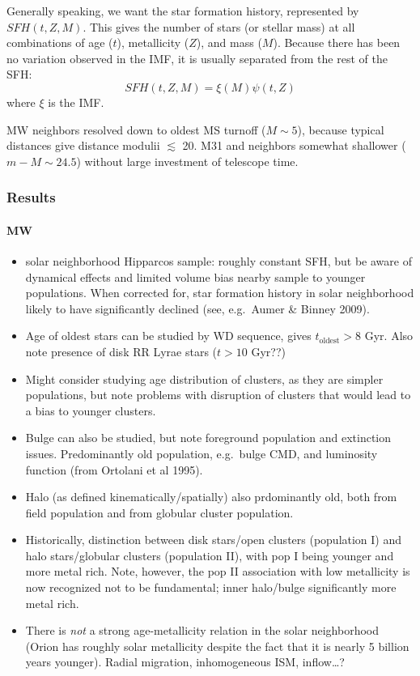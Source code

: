 \documentclass{article}
\begin{document}
Generally speaking, we want the star formation history, represented by
$SFH(t,Z,M)$. This gives the number of stars (or stellar mass)
at all combinations of age ($t$), metallicity ($Z$), and mass ($M$).
Because there has been no variation observed in the IMF, it is usually
separated from the rest of the SFH:
\[
    SFH(t,Z,M) = \xi(M)\psi(t,Z)
    \]
where $\xi$ is the IMF.

MW neighbors resolved down to oldest MS turnoff ($M \sim 5$),
because typical distances give distance modulii $\lesssim$ 20.
M31 and neighbors somewhat shallower ($m-M \sim 24.5$)
without large investment of telescope time.

\subsubsection{Results}
\paragraph{MW}
\begin{itemize}
    \item {solar neighborhood Hipparcos sample}: roughly constant {SFH}, but be
        aware of dynamical effects and limited volume bias nearby sample to
        younger populations. When corrected for, star formation history in
        solar neighborhood likely to have significantly declined (see, e.g.\
        {Aumer \& Binney 2009}).
    \item Age of oldest stars can be studied by WD sequence, gives
        $t_{\textrm{oldest}} > 8$ Gyr. Also note presence of disk RR Lyrae
        stars ($t > 10$ Gyr??)
    \item Might consider studying age distribution of clusters, as they are
        simpler populations, but note problems with disruption of clusters that
        would lead to a bias to younger clusters.
    \item Bulge can also be studied, but note foreground population and
        extinction issues. Predominantly old population, e.g.\ {bulge CMD}, and
        {luminosity function} (from {Ortolani et al 1995}).
    \item Halo (as defined kinematically/spatially) also prdominantly old, both
        from field population and from globular cluster population.
    \item Historically, distinction between disk stars/open clusters
        (population I) and halo stars/globular clusters (population II), with
        pop I being younger and more metal rich. Note, however, the pop II
        association with low metallicity is now recognized not to be
        fundamental; inner halo/bulge significantly more metal rich.
    \item There is \emph{not} a strong age-metallicity relation in the solar
        neighborhood (Orion has roughly solar metallicity despite the fact that it is nearly
        5 billion years younger).
        Radial migration, inhomogeneous ISM, inflow\ldots?
\end{itemize}
\end{document}
